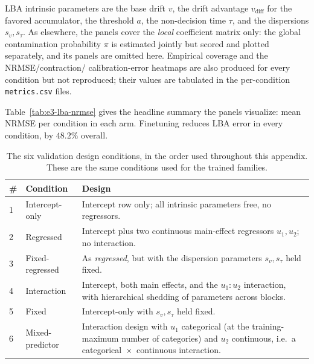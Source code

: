 LBA intrinsic parameters are the base drift $v$, the drift advantage
$v_{\mathrm{diff}}$ for the favored accumulator, the threshold $a$, the
non-decision time $\tau$, and the dispersions $s_v, s_\tau$. As elsewhere, the
panels cover the \emph{local} coefficient matrix only: the global contamination
probability $\pi$ is estimated jointly but scored and plotted separately, and
its panels are omitted here. Empirical coverage and the NRMSE/contraction/
calibration-error heatmaps are also produced for every condition but not
reproduced; their values are tabulated in the per-condition
\texttt{metrics.csv} files.

Table~\ref{tab:e3-lba-nrmse} gives the headline summary the panels visualize:
mean NRMSE per condition in each arm. Finetuning reduces LBA error in every
condition, by $48.2\%$ overall.

\begin{table}[htbp]
  \centering
  \small
  \begin{tabular}{@{}llp{7.0cm}@{}}
    \toprule
    \# & Condition & Design \\
    \midrule
    1 & Intercept-only    & Intercept row only; all intrinsic parameters free,
                            no regressors. \\
    2 & Regressed         & Intercept plus two continuous main-effect
                            regressors $u_1, u_2$; no interaction. \\
    3 & Fixed-regressed   & As \emph{regressed}, but with the dispersion
                            parameters $s_v, s_\tau$ held fixed. \\
    4 & Interaction       & Intercept, both main effects, and the
                            $u_1{:}u_2$ interaction, with hierarchical
                            shedding of parameters across blocks. \\
    5 & Fixed             & Intercept-only with $s_v, s_\tau$ held fixed. \\
    6 & Mixed-predictor   & Interaction design with $u_1$ categorical (at the
                            training-maximum number of categories) and $u_2$
                            continuous, i.e.\ a categorical~$\times$~continuous
                            interaction. \\
    \bottomrule
  \end{tabular}
  \caption{The six validation design conditions, in the order used throughout
    this appendix. These are the same conditions used for the trained families.}
  \label{tab:e3-lba-conditions}
\end{table}

